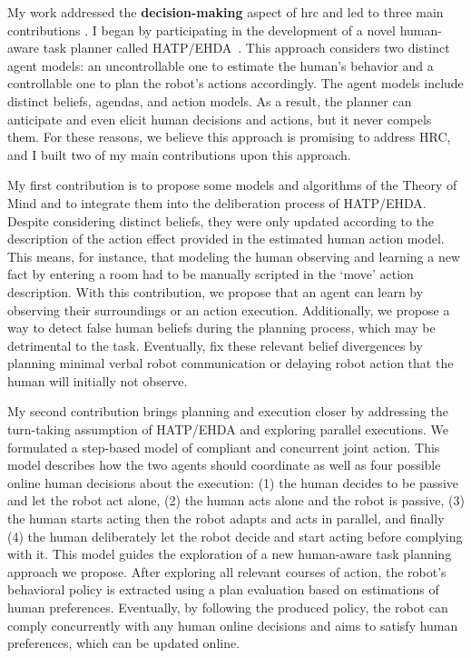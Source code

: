 
My work addressed the \textbf{decision-making} aspect of \acrshort{hrc} and led to three main contributions .
I began by participating in the development of a novel human-aware task planner called HATP/EHDA~\cite{buisan_hatpehda_icra}. This approach considers two distinct agent models: an uncontrollable one to estimate the human's behavior and a controllable one to plan the robot's actions accordingly. The agent models include distinct beliefs, agendas, and action models. As a result, the planner can anticipate and even elicit human decisions and actions, but it never compels them. For these reasons, we believe this approach is promising to address HRC, and I built two of my main contributions upon this approach.

My first contribution is to propose some models and algorithms of the Theory of Mind and to integrate them into the deliberation process of HATP/EHDA. Despite considering distinct beliefs, they were only updated according to the description of the action effect provided in the estimated human action model. This means, for instance, that modeling the human observing and learning a new fact by entering a room had to be manually scripted in the `move' action description. With this contribution, we propose that an agent can learn by observing their surroundings or an action execution. Additionally, we propose a way to detect false human beliefs during the planning process, which may be detrimental to the task. Eventually, fix these relevant belief divergences by planning minimal verbal robot communication or delaying robot action that the human will initially not observe.

My second contribution brings planning and execution closer by addressing the turn-taking assumption of HATP/EHDA and exploring parallel executions. We formulated a step-based model of compliant and concurrent joint action. This model describes how the two agents should coordinate as well as four possible online human decisions about the execution: (1) the human decides to be passive and let the robot act alone, (2) the human acts alone and the robot is passive, (3) the human starts acting then the robot adapts and acts in parallel, and finally (4) the human deliberately let the robot decide and start acting before complying with it. This model guides the exploration of a new human-aware task planning approach we propose. After exploring all relevant courses of action, the robot's behavioral policy is extracted using a plan evaluation based on estimations of human preferences. Eventually, by following the produced policy, the robot can comply concurrently with any human online decisions and aims to satisfy human preferences, which can be updated online.

